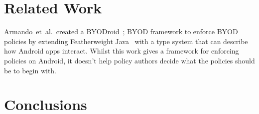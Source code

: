 \documentclass[a4paper]{article}
\makeatletter
\newcommand{\etal}[0]{et~al{.}\@}
\makeatother
\begin{document}
\section{Related Work}
\label{sec:related}

Armando~\etal~created a BYODroid~\cite{armando_bring_2013}; \ac{BYOD} framework to enforce \ac{BYOD} policies by extending Featherweight Java~\cite{igarashi_featherweight_2001} with a type system that can describe how Android apps interact.  Whilst this work gives a framework for enforcing policies on Android, it doesn't help policy authors decide what the policies should be to begin with.

\section{Conclusions}
\label{sec:conclusions}

{}

\end{document}
